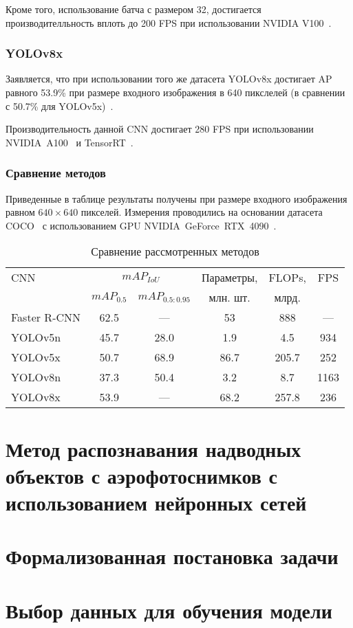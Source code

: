 Кроме того, использование батча с размером 32, достигается производителльность вплоть до 200 FPS при использовании NVIDIA V100~\cite{nvidia-v100}.

\subsubsection*{YOLOv8x}

Заявляется, что при использовании того же датасета YOLOv8x достигает AP равного 53.9\% при размере входного изображения в 640 пикслелей (в сравнении с 50.7\% для YOLOv5x)~\cite{yolo-review-2023}.

Производительность данной CNN достигает 280 FPS при использовании NVIDIA~A100~\cite{nvidia-a100} и TensorRT~\cite{nvidia-tensorrt}.

\subsubsection*{Сравнение методов}

Приведенные в таблице результаты получены при размере входного изображения равном $640 \times 640$ пикселей. Измерения проводились на основании датасета COCO~\cite{coco-benchmark} с использованием GPU NVIDIA~GeForce~RTX~4090~\cite{rtx4090}.

\begin{table}[!h]
    \small
    \begin{center}
        \caption{Сравнение рассмотренных методов}
        \label{tbl:cmp-by-ap}
        \begin{tabular}{|l|cc|c|c|c|}
            \hline
            CNN & \multicolumn{2}{c|}{$mAP_{IoU}$} & Параметры, & FLOPs, & FPS \\
                & $mAP_{0.5}$ & $mAP_{0.5:0.95}$    & млн. шт.   & млрд.  & \\\hline

            Faster R-CNN & 62.5 & ---  & 53   & 888   & --- \\
            YOLOv5n      & 45.7 & 28.0 & 1.9  & 4.5   & 934 \\
            YOLOv5x      & 50.7 & 68.9 & 86.7 & 205.7 & 252 \\
            YOLOv8n      & 37.3 & 50.4 & 3.2  & 8.7   & 1163 \\
            YOLOv8x      & 53.9 & ---  & 68.2 & 257.8 & 236 \\
            \hline
        \end{tabular}
    \end{center}
\end{table}

\section{Метод распознавания надводных объектов с аэрофотоснимков с использованием нейронных сетей}

\section{Формализованная постановка задачи}


\section{Выбор данных для обучения модели}

~\cite{kaggle-airbus}
